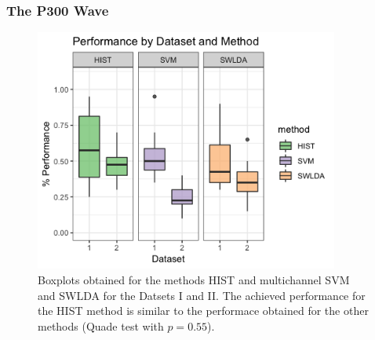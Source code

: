 \documentclass[aspectratio=169]{beamer}
\begin{document}
\begin{frame}
\frametitle{The P300 Wave}
\begin{center}
\begin{figure}[h!]
\centering
\includegraphics[width=10cm]{images/boxplots.png}
\caption[Dataset I and II Performance Boxplots]{Boxplots obtained for the methods HIST and multichannel SVM and SWLDA for the Datsets I and II.  The achieved performance for the HIST method is similar to the performace obtained for the other methods (Quade test with $p=0.55$).}
\label{fig:boxplots}
\end{figure}
\end{center}
\end{frame} 
\end{document}
